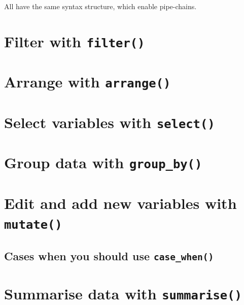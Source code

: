 \documentclass[]{book}
\begin{document}
All have the same syntax structure, which enable pipe-chains.

\hypertarget{filter-with-filter}{%
\section{\texorpdfstring{Filter with \texttt{filter()}}{Filter with filter()}}\label{filter-with-filter}}

\hypertarget{arrange-with-arrange}{%
\section{\texorpdfstring{Arrange with \texttt{arrange()}}{Arrange with arrange()}}\label{arrange-with-arrange}}

\hypertarget{select-variables-with-select}{%
\section{\texorpdfstring{Select variables with \texttt{select()}}{Select variables with select()}}\label{select-variables-with-select}}

\hypertarget{group-data-with-group_by}{%
\section{\texorpdfstring{Group data with \texttt{group\_by()}}{Group data with group\_by()}}\label{group-data-with-group_by}}

\hypertarget{edit-and-add-new-variables-with-mutate}{%
\section{\texorpdfstring{Edit and add new variables with \texttt{mutate()}}{Edit and add new variables with mutate()}}\label{edit-and-add-new-variables-with-mutate}}

\hypertarget{cases-when-you-should-use-case_when}{%
\subsection{\texorpdfstring{Cases when you should use \texttt{case\_when()}}{Cases when you should use case\_when()}}\label{cases-when-you-should-use-case_when}}

\hypertarget{summarise-data-with-summarise}{%
\section{\texorpdfstring{Summarise data with \texttt{summarise()}}{Summarise data with summarise()}}\label{summarise-data-with-summarise}}
\end{document}
